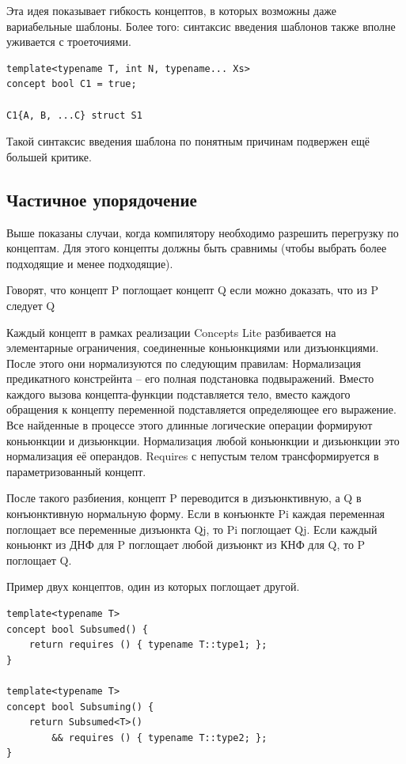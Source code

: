 \documentclass[a4paper,12pt,oneside]{book}
\begin{document}
Эта идея показывает гибкость концептов, в которых возможны даже вариабельные шаблоны. Более того: синтаксис введения шаблонов также вполне уживается с троеточиями.

\begin{lstlisting}
template<typename T, int N, typename... Xs> 
concept bool C1 = true;

C1{A, B, ...C} struct S1
\end{lstlisting}

Такой синтаксис введения шаблона по понятным причинам подвержен ещё большей критике.

\subsection{Частичное упорядочение}

Выше показаны случаи, когда компилятору необходимо разрешить перегрузку по концептам. Для этого концепты должны быть сравнимы (чтобы выбрать более подходящие и менее подходящие).

Говорят, что концепт P поглощает концепт Q если можно доказать, что из P следует Q

Каждый концепт в рамках реализации Concepts Lite разбивается на элементарные ограничения, соединенные коньюнкциями или дизъюнкциями. После этого они нормализуются по следующим правилам:
Нормализация предикатного констрейнта -- его полная подстановка подвыражений. Вместо каждого вызова концепта-функции подставляется тело, вместо каждого обращения к концепту переменной подставляется определяющее его выражение. Все найденные в процессе этого длинные логические операции формируют коньюнкции и дизьюнкции.
Нормализация любой коньюнкции и дизьюнкции это нормализация её операндов.
Requires с непустым телом трансформируется в параметризованный концепт.

После такого разбиения, концепт P переводится в дизъюнктивную, а Q в конъюнктивную нормальную форму. Если в конъюнкте Pi каждая переменная поглощает все переменные дизъюнкта Qj, то Pi поглощает Qj. Если каждый коньюнкт из ДНФ для P поглощает любой дизъюнкт из КНФ для Q, то P поглощает Q.

Пример двух концептов, один из которых поглощает другой.

\begin{lstlisting}
template<typename T>
concept bool Subsumed() {
    return requires () { typename T::type1; };
}

template<typename T>
concept bool Subsuming() {
    return Subsumed<T>()
        && requires () { typename T::type2; };
}
\end{lstlisting}
\end{document}
